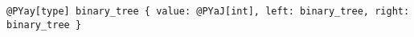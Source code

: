 \begin{Verbatim}[commandchars=@\[\]]
@PYay[type] binary_tree { value: @PYaJ[int], left: binary_tree, right: binary_tree }
\end{Verbatim}
